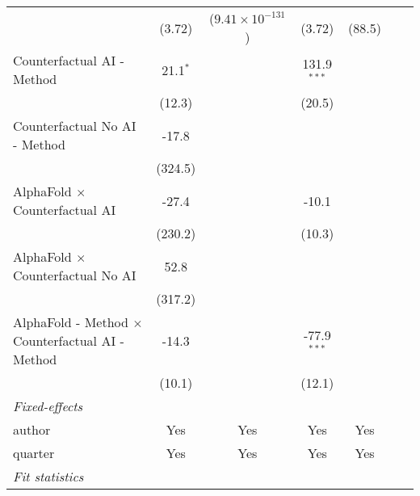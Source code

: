 \begin{tabular}{lcccccc}
                                                           & (3.72)     & ($9.41\times 10^{-131}$)  & (3.72)        & (88.5)         &      &   \\   
   Counterfactual AI - Method                              & 21.1$^{*}$ &                           & 131.9$^{***}$ &                &      &   \\   
                                                           & (12.3)     &                           & (20.5)        &                &      &   \\   
   Counterfactual No AI - Method                           & -17.8      &                           &               &                &      &   \\   
                                                           & (324.5)    &                           &               &                &      &   \\   
   AlphaFold $\times$ Counterfactual AI                    & -27.4      &                           & -10.1         &                &      &   \\   
                                                           & (230.2)    &                           & (10.3)        &                &      &   \\   
   AlphaFold $\times$ Counterfactual No AI                 & 52.8       &                           &               &                &      &   \\   
                                                           & (317.2)    &                           &               &                &      &   \\   
   AlphaFold - Method $\times$ Counterfactual AI - Method  & -14.3      &                           & -77.9$^{***}$ &                &      &   \\   
                                                           & (10.1)     &                           & (12.1)        &                &      &   \\   
   \midrule
   \emph{Fixed-effects}\\
   author                                                  & Yes        & Yes                       & Yes           & Yes            &      & \\  
   quarter                                                 & Yes        & Yes                       & Yes           & Yes            &      & \\  
   \midrule
   \emph{Fit statistics}\\

\end{tabular}
